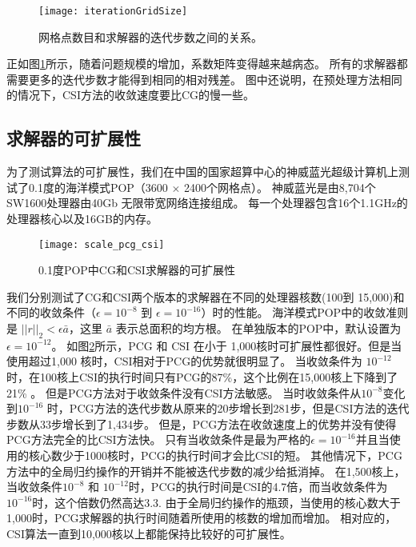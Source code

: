 \begin{figure} 
\vspace{5pt}
\centering
\texttt{[image: iterationGridSize]}
\caption[] {网格点数目和求解器的迭代步数之间的关系。\label{fig:iterationGridSize}}
\end{figure}

正如图\ref{fig:iterationGridSize}所示，随着问题规模的增加，系数矩阵变得越来越病态。
所有的求解器都需要更多的迭代步数才能得到相同的相对残差。 
图中还说明，在预处理方法相同的情况下，CSI方法的收敛速度要比CG的慢一些。 



 
\subsection{求解器的可扩展性} \label{solver:exp:csi}

为了测试算法的可扩展性，我们在中国的国家超算中心的神威蓝光超级计算机上测试了0.1度的海洋模式POP（3600 $\times$ 2400个网格点）。
神威蓝光是由8,704个SW1600处理器由40Gb 无限带宽网络连接组成。
每一个处理器包含16个1.1GHz的处理器核心以及16GB的内存。 

\begin {figure}
\centering
\texttt{[image: scale\_pcg\_csi]}
\caption []{ 0.1度POP中CG和CSI求解器的可扩展性 \label {fig:scale}}
\end {figure}
我们分别测试了CG和CSI两个版本的求解器在不同的处理器核数(100到 15,000)和不同的收敛条件（$\epsilon = 10^{-8}$ 到 $\epsilon = 10^{-16}$）时的性能。
海洋模式POP中的收敛准则是 $||r||_2<\epsilon \bar{a}$，这里 $\bar{a}$ 表示总面积的均方根。 
在单独版本的POP中，默认设置为 $\epsilon = 10^{-12}$。 
如图\ref{fig:scale}所示，PCG 和 CSI 在小于  1,000核时可扩展性都很好。但是当使用超过1,000 核时，CSI相对于PCG的优势就很明显了。 
当收敛条件为 $10^{-12}$时，在100核上CSI的执行时间只有PCG的87\%，这个比例在15,000核上下降到了 21\% 。
但是PCG方法对于收敛条件没有CSI方法敏感。 
当时收敛条件从$10^{-8}$变化到$10^{-16}$ 时，PCG方法的迭代步数从原来的20步增长到281步，但是CSI方法的迭代步数从33步增长到了1,434步。 
但是，PCG方法在收敛速度上的优势并没有使得PCG方法完全的比CSI方法快。 
只有当收敛条件是最为严格的$\epsilon = 10^{-16}$并且当使用的核心数少于1000核时，PCG的执行时间才会比CSI的短。
其他情况下，PCG方法中的全局归约操作的开销并不能被迭代步数的减少给抵消掉。
在1,500核上，当收敛条件$10^{-8}$ 和 $10^{-12}$时，PCG的执行时间是CSI的4.7倍，而当收敛条件为$10^{-16}$时，这个倍数仍然高达3.3. 
由于全局归约操作的瓶颈，当使用的核心数大于1,000时，PCG求解器的执行时间随着所使用的核数的增加而增加。 
相对应的，CSI算法一直到10,000核以上都能保持比较好的可扩展性。


